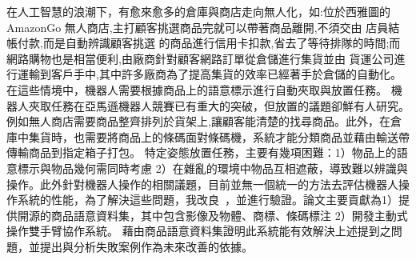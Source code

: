 \begin{abstractzh}
在人工智慧的浪潮下，有愈來愈多的倉庫與商店走向無人化，如:位於西雅圖的 AmazonGo 無人商店,主打顧客挑選商品完就可以帶著商品離開,不須交由
店員結帳付款,而是自動辨識顧客挑選 的商品進行信用卡扣款,省去了等待排隊的時間;而網路購物也是相當便利,由廠商針對顧客網路訂單從倉儲進行集貨並由
貨運公司進行運輸到客戶手中,其中許多廠商為了提高集貨的效率已經著手於倉儲的自動化。在這些情境中，機器人需要根據商品上的語意標示進行自動夾取與放置任務。
機器人夾取任務在亞馬遜機器人競賽已有重大的突破，但放置的議題卻鮮有人研究。例如無人商店需要商品整齊排列於貨架上,讓顧客能清楚的找尋商品。此外，在倉庫中集貨時，也需要將商品上的條碼面對條碼機，系統才能分類商品並藉由輸送帶傳輸商品到指定箱子打包。
特定姿態放置任務，主要有幾項困難：1）物品上的語意標示與物品幾何需同時考慮 2）在雜亂的環境中物品互相遮蔽，導致難以辨識與操作。此外針對機器人操作的相關議題，目前並無一個統一的方法去評估機器人操作系統的性能，為了解決這些問題，我改良~\cite{peterthesis}，並進行驗證。論文主要貢獻為1）提供開源的商品語意資料集，其中包含影像及物體、商標、條碼標注 2）開發主動式操作雙手臂協作系統。
藉由商品語意資料集證明此系統能有效解決上述提到之問題，並提出與分析失敗案例作為未來改善的依據。

\end{abstractzh}

